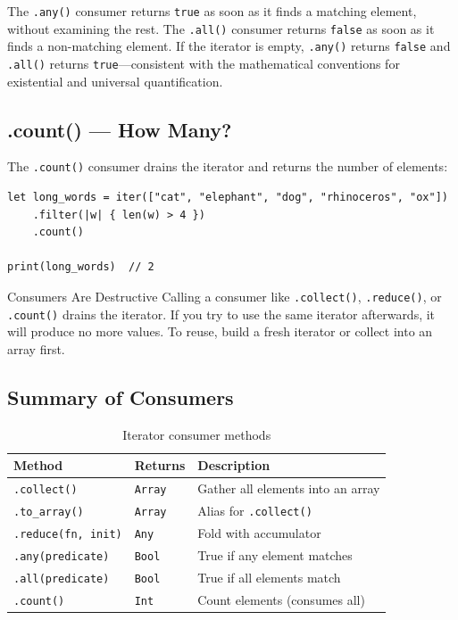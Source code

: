 The \lstinline|.any()| consumer returns \lstinline|true| as soon as it finds a matching element, without examining the rest.
The \lstinline|.all()| consumer returns \lstinline|false| as soon as it finds a non-matching element.
If the iterator is empty, \lstinline|.any()| returns \lstinline|false| and \lstinline|.all()| returns \lstinline|true|---consistent with the mathematical conventions for existential and universal quantification.

\subsection{.count() --- How Many?}\label{subsec:iter-count}

The \lstinline|.count()| consumer drains the iterator and returns the number of elements:

\begin{lstlisting}[language=Lattice, caption={Counting elements}]
let long_words = iter(["cat", "elephant", "dog", "rhinoceros", "ox"])
    .filter(|w| { len(w) > 4 })
    .count()

print(long_words)  // 2
\end{lstlisting}

\begin{notebox}{Consumers Are Destructive}
Calling a consumer like \lstinline|.collect()|, \lstinline|.reduce()|, or \lstinline|.count()| drains the iterator.
If you try to use the same iterator afterwards, it will produce no more values.
To reuse, build a fresh iterator or collect into an array first.
\end{notebox}

\subsection{Summary of Consumers}\label{subsec:consumer-summary}

\begin{table}[htbp]
\centering
\caption{Iterator consumer methods}\label{tab:iter-consumers}
\begin{tabular}{@{}lll@{}}
\toprule
\textbf{Method} & \textbf{Returns} & \textbf{Description} \\
\midrule
\lstinline|.collect()| & \lstinline|Array| & Gather all elements into an array \\
\lstinline|.to_array()| & \lstinline|Array| & Alias for \lstinline|.collect()| \\
\lstinline|.reduce(fn, init)| & \lstinline|Any| & Fold with accumulator \\
\lstinline|.any(predicate)| & \lstinline|Bool| & True if any element matches \\
\lstinline|.all(predicate)| & \lstinline|Bool| & True if all elements match \\
\lstinline|.count()| & \lstinline|Int| & Count elements (consumes all) \\
\bottomrule
\end{tabular}
\end{table}

